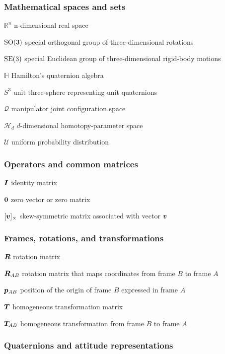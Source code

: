 % 
% 

\subsubsection*{Mathematical spaces and sets}

$\mathbb{R}^n$ n-dimensional real space

$\mathrm{SO}(3)$ special orthogonal group of three-dimensional rotations

$\mathrm{SE}(3)$ special Euclidean group of three-dimensional rigid-body motions

$\mathbb{H}$ Hamilton's quaternion algebra

$S^3$ unit three-sphere representing unit quaternions

$\mathcal{Q}$ manipulator joint configuration space

$\mathcal{H}_d$ $d$-dimensional homotopy-parameter space

$\mathcal{U}$ uniform probability distribution

\subsubsection*{Operators and common matrices}

$\bm{I}$ identity matrix

$\bm{0}$ zero vector or zero matrix

$[\bm{v}]_\times$ skew-symmetric matrix associated with vector $\bm{v}$

\subsubsection*{Frames, rotations, and transformations}

$\bm{R}$ rotation matrix

$\bm{R}_{AB}$ rotation matrix that maps coordinates from frame $B$ to frame $A$

$\bm{p}_{AB}$ position of the origin of frame $B$ expressed in frame $A$

$\bm{T}$ homogeneous transformation matrix

$\bm{T}_{AB}$ homogeneous transformation from frame $B$ to frame $A$

\subsubsection*{Quaternions and attitude representations}

